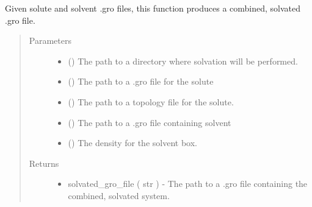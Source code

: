 \documentclass[letterpaper,12pt,english,openany,oneside]{sphinxmanual}
\begin{document}
\begin{fulllineitems}
\label{\detokenize{simulation:simulation.solvate}}
Given solute and solvent .gro files, this function produces a combined, solvated .gro file.
\begin{quote}\begin{description}
\item[{Parameters}] \leavevmode\begin{itemize}
\item {} 
 () \textendash{} The path to a directory where solvation will be performed.

\item {} 
 () \textendash{} The path to a .gro file for the solute

\item {} 
 () \textendash{} The path to a topology file for the solute.

\item {} 
 () \textendash{} The path to a .gro file containing solvent

\item {} 
 () \textendash{} The density for the solvent box.

\end{itemize}

\item[{Returns}] \leavevmode
\begin{itemize}
\item {} 
solvated\_gro\_file ( str ) - The path to a .gro file containing the combined, solvated system.

\end{itemize}


\end{description}\end{quote}

\end{fulllineitems}
\end{document}
